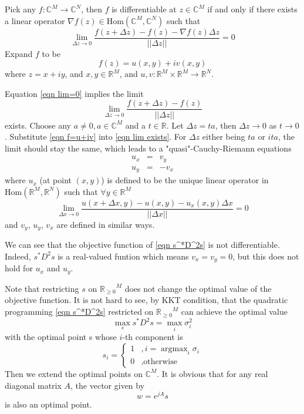 \documentclass[12pt]{article}
\theoremstyle{remark}
\DeclareMathOperator*{\argmax}{argmax}
\begin{document}
Pick any $f:\mathbb{C}^M\rightarrow\mathbb{C}^N$, then $f$ is differentiable at $z\in\mathbb{C}^M$ if and only if there exists a linear operator $\nabla f(z)\in\mbox{Hom}\left(\mathbb{C}^M,\mathbb{C}^N \right)$ such that
\begin{equation}
	\lim_{\Delta z\rightarrow0}\frac{f(z+\Delta z)-f(z)-\nabla f(z)\Delta z}{||\Delta z||}=0\label{eqn lim=0}
\end{equation}
Expand $f$ to be 
\begin{equation}
	f(z)=u(x,y)+iv(x,y)\label{eqn f=u+iv}
\end{equation}
where $z=x+iy$, and $x,y\in\mathbb{R}^M$, and $u,v:\mathbb{R}^M\times\mathbb{R}^M\rightarrow\mathbb{R}^N$.

Equation \ref{eqn lim=0} implies the limit
\begin{equation}
	\lim_{\Delta z\rightarrow0}\frac{f(z+\Delta z)-f(z)}{||\Delta z||}\label{eqn lim exists}
\end{equation}
exists. Choose any $a\not=0,a\in\mathbb{C}^M$ and a $t\in\mathbb{R}$. Let $\Delta z=ta$, then $\Delta z\rightarrow0$ as $t\rightarrow0$. Substitute \ref{eqn f=u+iv} into \ref{eqn lim exists}. For $\Delta z$ either being $ta$ or $ita$, the limit should stay the same, which leads to a "quasi"-Cauchy-Riemann equations
\begin{eqnarray*}
	u_x&=&v_y\\
	u_y&=&-v_x
\end{eqnarray*}
where $u_x$ (at point $\left(x,y\right)$) is defined to be the unique linear operator in $\mbox{Hom}\left(\mathbb{R}^M,\mathbb{R}^N\right)$ such that $\forall y\in\mathbb{R}^M$
$$\lim_{\Delta x\rightarrow0}\frac{u(x+\Delta x,y)-u(x,y)-u_x(x,y)\Delta x}{||\Delta x||}=0$$
and $v_y$, $u_y$, $v_x$ are defined in similar ways.

We can see that the objective function of \ref{eqn s^*D^2s} is not differentiable. Indeed, $s^*D^2s$ is a real-valued funtion which means $v_x=v_y=0$, but this does not hold for $u_x$ and $u_y$.

Note that restricting $s$ on ${\mathbb{R}_{\geq0}}^M$ does not change the optimal value of the objective function. It is not hard to see, by KKT condition, that the quadratic programming \ref{eqn s^*D^2s} restricted on ${\mathbb{R}_{\geq0}}^M$ can achieve the optimal value $$\max_ss^*D^2s=\max_i \sigma_i^2$$ with the optimal point s whose $i$-th component is
$$
s_i=\left\{ 
\begin{matrix}
	1&,i=\argmax_i\sigma_i\\
	0&,\mbox{otherwise}	
\end{matrix}
\right.
$$
Then we extend the optimal points on $\mathbb{C}^M$. It is obvious that for any real diagonal matrix $A$, the vector given by
$$w=e^{jA}s$$
is also an optimal point.
\end{document}
